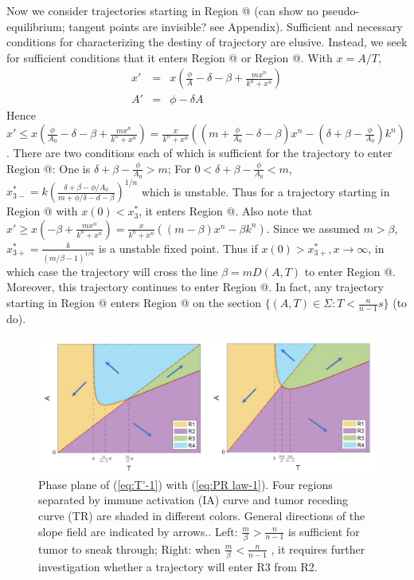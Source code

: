 \documentclass[review,authoryear]{elsarticle}
\makeatletter
\newcommand*{\rom}[1]{\expandafter\@slowromancap\romannumeral #1@}
\makeatother
\begin{document}
Now we consider trajectories starting in Region \rom{3} (can show no pseudo-equilibrium;
tangent points are invisible? see Appendix). Sufficient and necessary
conditions for characterizing the destiny of trajectory are elusive.
Instead, we seek for sufficient conditions that it enters Region \rom{4} or Region \rom{2}.
With $x=A/T$, 
\begin{eqnarray*}
x' & = & x(\frac{\phi}{A}-\delta-\beta+\frac{mx^{n}}{k^{n}+x^{n}})\\
A' & = & \phi-\delta A
\end{eqnarray*}
Hence $x'\le x(\frac{\phi}{A_{0}}-\delta-\beta+\frac{mx^{n}}{k^{n}+x^{n}})=\frac{x}{k^{n}+x^{n}}((m+\frac{\phi}{A_{0}}-\delta-\beta)x^{n}-(\delta+\beta-\frac{\phi}{A_{0}})k^{n})$.
There are two conditions each of which is sufficient for the trajectory
to enter Region \rom{2}: One is $\delta+\beta-\frac{\phi}{A_{0}}>m$; For $0<\delta+\beta-\frac{\phi}{A_{0}}<m$,
$x_{3-}^{*}=k(\frac{\delta+\beta-\phi/A_{0}}{m+\phi/\delta-d-\beta})^{1/n}$
which is unstable. Thus for a trajectory starting in Region \rom{3} with $x(0)<x_{3}^{*}$,
it enters Region \rom{2}. Also note that $x'\ge x(-\beta+\frac{mx^{n}}{k^{n}+x^{n}})=\frac{x}{k^{n}+x^{n}}((m-\beta)x^{n}-\beta k^{n})$.
Since we assumed $m>\beta$, $x_{3+}^{*}=\frac{k}{(m/\beta-1)^{1/n}}$
is a unstable fixed point. Thus if $x(0)>x_{3+}^{*},x\to\infty$,
in which case the trajectory will cross the line $\beta=mD(A,T)$
to enter Region \rom{4}. Moreover, this trajectory continues to enter Region \rom{1}. In fact,
any trajectory starting in Region \rom{4} enters Region \rom{1} on the section $\{(A,T)\in\Sigma:T<\frac{n}{n-1}s\}$
(to do). 

\begin{figure}
\centerline{\includegraphics[width=1\linewidth]{figs/dP-PP-4regions}}

\caption{Phase plane of (\ref{eq:T'-1}) with (\ref{eq:PR law-1}). Four regions
separated by immune activation (IA) curve and tumor receding curve
(TR) are shaded in different colors. General directions of the slope
field are indicated by arrows.\label{fig:dP-PP-4regions}. Left: $\frac{m}{\beta}>\frac{n}{n-1}$
is sufficient for tumor to sneak through; Right: when $\frac{m}{\beta}<\frac{n}{n-1}$
, it requires further investigation whether a trajectory will enter
R3 from R2. }
\end{figure}
\end{document}
